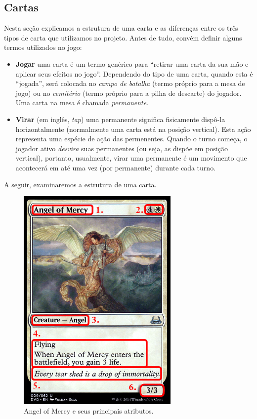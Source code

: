\subsection{Cartas}

Nesta seção explicamos a estrutura de uma carta e as diferenças entre os três tipos de carta que utilizamos no projeto. Antes de tudo, convém definir alguns termos utilizados no jogo:

\begin{itemize}
  \item \textbf{Jogar} uma carta é um termo genérico para ``retirar uma carta da sua mão e aplicar seus efeitos no jogo''. Dependendo do tipo de uma carta, quando esta é ``jogada'', será colocada no \textit{campo de batalha} (termo próprio para a mesa de jogo) ou no \textit{cemitério} (termo próprio para a pilha de descarte) do jogador. Uma carta na mesa é chamada \textit{permanente}.
  \item \textbf{Virar} (em inglês, \textit{tap}) uma permanente significa fisicamente dispô-la horizontalmente (normalmente uma carta está na posição vertical). Esta ação representa uma espécie de ação das permenentes. Quando o turno começa, o jogador ativo \textit{desvira} suas permanentes (ou seja, as dispõe em posição vertical), portanto, usualmente, virar uma permanente é um movimento que acontecerá em até uma vez (por permanente) durante cada turno.
\end{itemize}

A seguir, examinaremos a estrutura de uma carta.

\begin{figure}[!ht]
    \centering
    \includegraphics[width=0.7\textwidth]{picstcc/angelnumbers.png}
    \caption{Angel of Mercy e seus principais atributos.}
    \label{cardinfo}
\end{figure}

